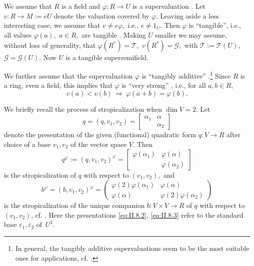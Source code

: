 \documentclass [12pt,a4paper,reqno]{amsart}
\begin{document}
We assume that $R$ is a field and ${\varphi}: R\to U$ is a supervaluation \cite[\S4]{IKR1}. Let $v: R\to M:=eU$ denote the valuation covered by ${\varphi}.$ Leaving aside a less interesting case, we assume that $v\ne e{\varphi},$ i.e., $e\ne 1_U.$ Then ${\varphi}$ is ``tangible'', i.e., all values ${\varphi}(a),$ $a\in R,$ are tangible \cite[Proposition~8.13]{IKR1}. Making $U$ smaller we may assume, without loss of generality, that ${\varphi}(R^*)={\mathcal T},$ $v(R^*)={\mathcal G},$ with ${\mathcal T}:={\mathcal T}(U)$, ${\mathcal G}={\mathcal G}(U).$ Now $U$ is a tangible supersemifield.

We further assume that the supervaluation ${\varphi}$ is ``tangibly additive'' \cite[Definition~9.6]{IKR1}.\footnote{In general, the tangibly additive supervaluations seem to be the most suitable ones for applications, cf. \cite[\S9-\S11]{IKR1}.} Since $R$ is a ring, even a field, this implies that ${\varphi}$ is ``very strong'' \cite[\S10]{IKR1}, i.e., for all $a,b\in R,$
\begin{equation}\label{eq:II.8.1}
v(a)< v(b){\ {\Rightarrow} \ }{\varphi}(a+b)={\varphi}(b).\end{equation}

We briefly recall the process of stropicalization when  $\dim V=2. $ Let
$$q=(q,v_1,v_2)=\begin{bmatrix} {\alpha}_1 & {\alpha}\\  &{\alpha}_2\end{bmatrix}$$
denote the presentation of the given (functional) quadratic form $q: V\to R$ after choice of a base $v_1,v_2$ of the vector space $V.$ Then
\begin{equation}\label{eq:II.8.2}
q^{\varphi}:=(q,v_1,v_2)^{\varphi}=\begin{bmatrix}{\varphi}({\alpha}_1) & {\varphi}({\alpha})\\  & {\varphi}({\alpha}_2)\end{bmatrix} \end{equation}
is the stropicalization of $q$ with respect to $(v_1,v_2),$ and
\begin{equation}\label{eq:II.8.3}
 b^{\varphi}=(b,v_1,v_2)^{\varphi}=\begin{pmatrix} {\varphi}(2){\varphi}({\alpha}_1) & {\varphi}({\alpha})\\ {\varphi}({\alpha}) &{\varphi}(2){\varphi}({\alpha}_2)\end{pmatrix}\end{equation}
is the stropicalization of the unique companion $b: V\times V\to R$ of $q$ with respect to $(v_1,v_2)$, cf. \cite[{Eq. ({9.14})} and {Eq. ({9.15})}]{QF1}.
Here the presentations
\eqref{eq:II.8.2}, \eqref{eq:II.8.3}
refer to the standard base ${\varepsilon}_1,{\varepsilon}_2$ of~$U^2.$
\end{document}
